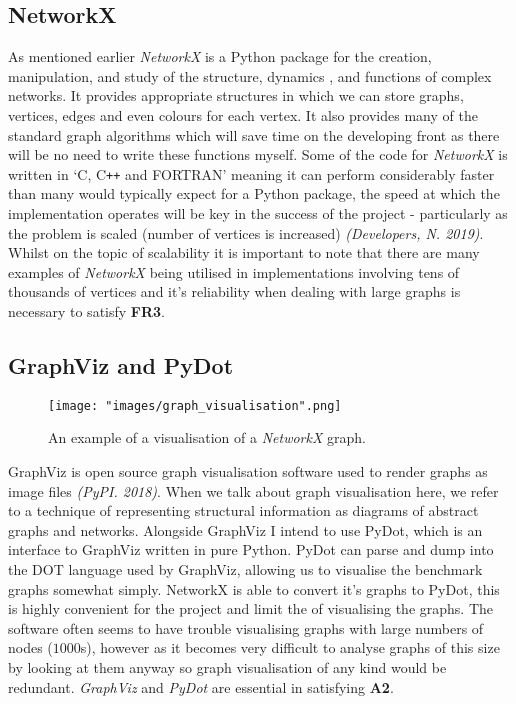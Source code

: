 \documentclass[12pt,a4paper]{article}
\begin{document}
\subsection*{NetworkX}
\noindent
As mentioned earlier \textit{NetworkX} is a Python package for the creation, manipulation, and study of the structure, dynamics , and functions of complex networks. It provides appropriate structures in which we can store graphs, vertices, edges and even colours for each vertex. It also provides many of the standard graph algorithms which will save time on the developing front as there will be no need to write these functions myself. Some of the code for \textit{NetworkX} is written in `C, C\texttt{++} and FORTRAN' meaning it can perform considerably faster than many would typically expect for a Python package, the speed at which the implementation operates will be key in the success of the project - particularly as the problem is scaled (number of vertices is increased) \textit{(Developers, N. 2019)}. Whilst on the topic of scalability it is important to note that there are many examples of \textit{NetworkX} being utilised in implementations involving tens of thousands of vertices and it's reliability when dealing with large graphs is necessary to satisfy \textbf{FR3}.
\subsection*{GraphViz and PyDot}
\noindent
\begin{wrapfigure}{h}{0.49\textwidth}
\texttt{[image: "images/graph\_visualisation".png]}
\caption{An example of a visualisation of a \textit{NetworkX} graph.}
\label{fig:hyb}
\end{wrapfigure}
GraphViz is open source graph visualisation software used to render graphs as image files \textit{(PyPI. 2018)}. When we talk about graph visualisation here, we refer to a technique of representing structural information as diagrams of abstract graphs and networks. Alongside GraphViz I intend to use PyDot, which is an interface to GraphViz written in pure Python. PyDot can parse and dump into the DOT language used by GraphViz, allowing us to visualise the benchmark graphs somewhat simply. NetworkX is able to convert it's graphs to PyDot, this is highly convenient for the project and limit the of visualising the graphs. The software often seems to have trouble visualising graphs with large numbers of nodes ($1000$s), however as it becomes very difficult to analyse graphs of this size by looking at them anyway so graph visualisation of any kind would be redundant. \textit{GraphViz} and \textit{PyDot} are essential in satisfying \textbf{A2}.
\end{document}

